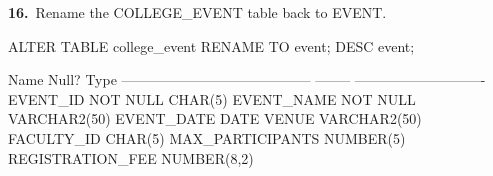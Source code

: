 
\noindent\begin{minipage}{\linewidth}
\begingroup{}
{\fontsize{14}{17}\selectfont\textbf{16.}}\ Rename the COLLEGE\_EVENT table back to EVENT.\par
\endgroup\vspace{12pt}


\begin{sqlcode}
ALTER TABLE college_event RENAME TO event;
DESC event;
\end{sqlcode}

\vspace{18pt}


\begin{sqlout}
 Name                                      Null?    Type
 ----------------------------------------- -------- ----------------------------
 EVENT_ID                                  NOT NULL CHAR(5)
 EVENT_NAME                                NOT NULL VARCHAR2(50)
 EVENT_DATE                                         DATE
 VENUE                                              VARCHAR2(50)
 FACULTY_ID                                         CHAR(5)
 MAX_PARTICIPANTS                                   NUMBER(5)
 REGISTRATION_FEE                                   NUMBER(8,2)
\end{sqlout}
\end{minipage}\par\vspace{30pt}

